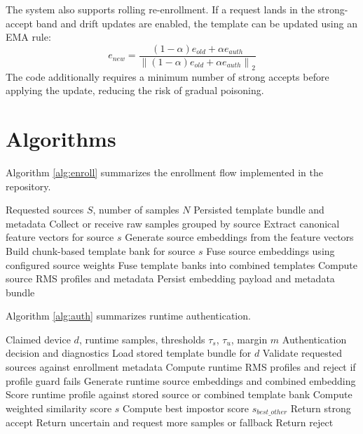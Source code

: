 \documentclass[12pt]{report}
\begin{document}
The system also supports rolling re-enrollment. If a request lands in the strong-accept band and drift updates are enabled, the template can be updated using an EMA rule:
\begin{equation}
e_{new} = \frac{(1-\alpha)e_{old} + \alpha e_{auth}}{\left\lVert (1-\alpha)e_{old} + \alpha e_{auth} \right\rVert_2}
\end{equation}
The code additionally requires a minimum number of strong accepts before applying the update, reducing the risk of gradual poisoning.

\section{Algorithms}
Algorithm \ref{alg:enroll} summarizes the enrollment flow implemented in the repository.

\begin{algorithm}[H]
\caption{Multi-source device enrollment}
\label{alg:enroll}
\begin{algorithmic}[1]
\Require Requested sources $S$, number of samples $N$
\Ensure Persisted template bundle and metadata
\State Collect or receive raw samples grouped by source
    \State Extract canonical feature vectors for source $s$
    \State Generate source embeddings from the feature vectors
    \State Build chunk-based template bank for source $s$
\EndFor
\State Fuse source embeddings using configured source weights
\State Fuse template banks into combined templates
\State Compute source RMS profiles and metadata
\State Persist embedding payload and metadata bundle
\end{algorithmic}
\end{algorithm}

Algorithm \ref{alg:auth} summarizes runtime authentication.

\begin{algorithm}[H]
\caption{Authentication with confidence bands and margin guard}
\label{alg:auth}
\begin{algorithmic}[1]
\Require Claimed device $d$, runtime samples, thresholds $\tau_s$, $\tau_u$, margin $m$
\Ensure Authentication decision and diagnostics
\State Load stored template bundle for $d$
\State Validate requested sources against enrollment metadata
\State Compute runtime RMS profiles and reject if profile guard fails
\State Generate runtime source embeddings and combined embedding
\State Score runtime profile against stored source or combined template bank
\State Compute weighted similarity score $s$
\State Compute best impostor score $s_{best\_other}$
    \State Return strong accept
    \State Return uncertain and request more samples or fallback
\Else
    \State Return reject
\EndIf
\end{algorithmic}
\end{algorithm}
\end{document}
